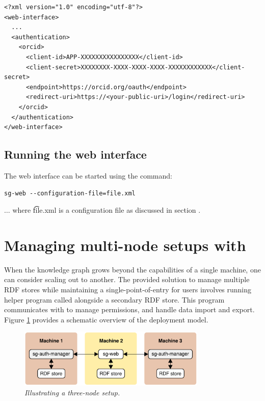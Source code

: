 \begin{siderules}
\begin{verbatim}
<?xml version="1.0" encoding="utf-8"?>
<web-interface>
  ...
  <authentication>
    <orcid>
      <client-id>APP-XXXXXXXXXXXXXXXX</client-id>
      <client-secret>XXXXXXXX-XXXX-XXXX-XXXX-XXXXXXXXXXXX</client-secret>
      <endpoint>https://orcid.org/oauth</endpoint>
      <redirect-uri>https://<your-public-uri>/login</redirect-uri>
    </orcid>
  </authentication>
</web-interface>
\end{verbatim}
\end{siderules}

\subsection{Running the web interface}

  The web interface can be started using the  command:

\begin{siderules}
\begin{verbatim}
sg-web --configuration-file=file.xml
\end{verbatim}
\end{siderules}

  $\ldots{}$ where \t{file.xml} is a configuration file as
  discussed in section .

\pagebreak{}
\section{Managing multi-node setups with }

  When the knowledge graph grows beyond the capabilities of a single machine,
  one can consider scaling out to another.  The provided solution to manage
  multiple RDF stores while maintaining a single-point-of-entry for users
  involves running helper program called  alongside
  a secondary RDF store.  This program communicates with  to
  manage permissions, and handle data import and export.  Figure
  \ref{fig:sg-auth-manager} provides a schematic overview of the deployment
  model.

  \begin{figure}[H]
    \begin{center}
    \includegraphics[width=0.8\textwidth]{figures/sg-auth-manager-scaleout.pdf}
    \end{center}
    \caption{\textit{Illustrating a three-node setup.}}
    \label{fig:sg-auth-manager}
  \end{figure}

